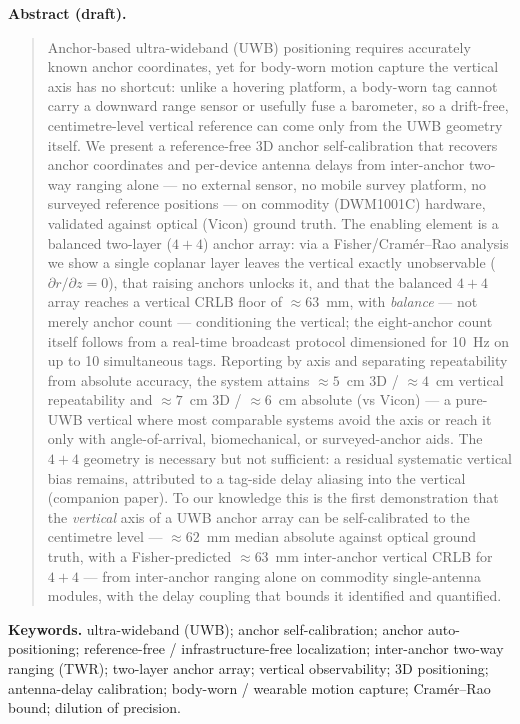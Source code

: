 \documentclass[11pt,a4paper]{article}
\begin{document}
\textbf{Abstract (draft).}
\begin{quote}\small
Anchor-based ultra-wideband (UWB) positioning requires accurately known anchor coordinates, yet for
body-worn motion capture the vertical axis has no shortcut: unlike a hovering platform, a body-worn
tag cannot carry a downward range sensor or usefully fuse a barometer, so a drift-free,
centimetre-level vertical reference can come only from the UWB geometry itself. We present a
reference-free 3D anchor self-calibration that recovers anchor coordinates and per-device antenna
delays from inter-anchor two-way ranging alone --- no external sensor, no mobile survey platform, no
surveyed reference positions --- on commodity (DWM1001C) hardware, validated against optical (Vicon)
ground truth. The enabling element is a balanced two-layer ($4{+}4$) anchor array: via a
Fisher/Cram\'{e}r--Rao analysis we show a single coplanar layer leaves the vertical exactly
unobservable ($\partial r/\partial z = 0$), that raising anchors unlocks it, and that the balanced
$4{+}4$ array reaches a vertical CRLB floor of ${\approx}63$~mm, with \emph{balance} --- not merely
anchor count --- conditioning the vertical; the eight-anchor count itself follows from a real-time
broadcast protocol dimensioned for 10~Hz on up to 10 simultaneous tags. Reporting by axis and
separating repeatability from absolute accuracy, the system attains ${\approx}5$~cm 3D / ${\approx}4$~cm
vertical repeatability and ${\approx}7$~cm 3D / ${\approx}6$~cm absolute (vs Vicon) --- a pure-UWB
vertical where most comparable systems avoid the axis or reach it only with angle-of-arrival,
biomechanical, or surveyed-anchor aids. The $4{+}4$ geometry is necessary but not sufficient: a residual systematic vertical
bias remains, attributed to a tag-side delay aliasing into the vertical (companion paper). To our knowledge this is
the first demonstration that the \emph{vertical} axis of a UWB anchor array can be self-calibrated to
the centimetre level --- ${\approx}62$~mm median absolute against optical ground truth, with a Fisher-predicted ${\approx}63$~mm
inter-anchor vertical CRLB for $4{+}4$ --- from inter-anchor ranging alone on commodity single-antenna
modules, with the delay coupling that bounds it identified and quantified.
\end{quote}

\textbf{Keywords.} ultra-wideband (UWB); anchor self-calibration; anchor auto-positioning;
reference-free / infrastructure-free localization; inter-anchor two-way ranging (TWR); two-layer
anchor array; vertical observability; 3D positioning; antenna-delay calibration; body-worn / wearable
motion capture; Cram\'{e}r--Rao bound; dilution of precision.
\end{document}
